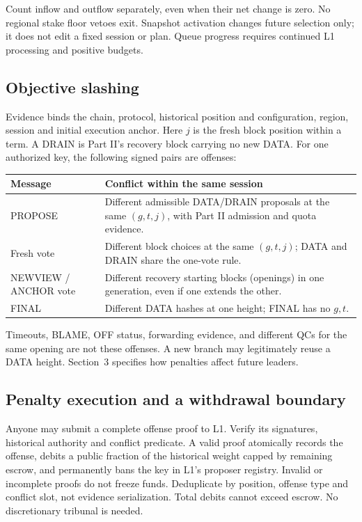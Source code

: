 \documentclass[11pt,a4paper]{article}
\begin{document}
Count inflow and outflow separately, even when their net change is zero.
No regional stake floor vetoes exit. Snapshot activation changes future
selection only; it does not edit a fixed session or plan. Queue progress
requires continued L1 processing and positive budgets.

\subsection{Objective slashing}
Evidence binds the chain, protocol, historical position and configuration,
region, session and initial execution anchor. Here $j$ is the fresh block
position within a term. A DRAIN is Part II's recovery block carrying no
new DATA. For one authorized key, the following signed pairs are offenses:

\begin{tabularx}{\linewidth}{@{}>{\raggedright\arraybackslash}p{.24\linewidth}Y@{}}\toprule
Message & Conflict within the same session\\\midrule
PROPOSE & Different admissible DATA/DRAIN proposals at the same $(g,t,j)$,
with Part II admission and quota evidence.\\
Fresh vote & Different block choices at the same $(g,t,j)$; DATA and DRAIN
share the one-vote rule.\\
NEWVIEW / ANCHOR vote & Different recovery starting blocks (openings)
in one generation, even if one extends the other.\\
FINAL & Different DATA hashes at one height; FINAL has no $g,t$.\\\bottomrule
\end{tabularx}

Timeouts, BLAME, OFF status, forwarding evidence, and different QCs for the
same opening are not these offenses. A new branch may legitimately reuse
a DATA height. Section~3 specifies how penalties affect future leaders.

\newpage
\subsection{Penalty execution and a withdrawal boundary}
Anyone may submit a complete offense proof to L1. Verify its signatures,
historical authority and conflict predicate. A valid proof atomically
records the offense, debits a public fraction of the historical weight
capped by remaining escrow, and permanently bans the key in L1's proposer
registry. Invalid or incomplete proofs do not freeze funds. Deduplicate
by position, offense type and conflict slot, not evidence serialization.
Total debits cannot exceed escrow. No discretionary tribunal is needed.
\end{document}
